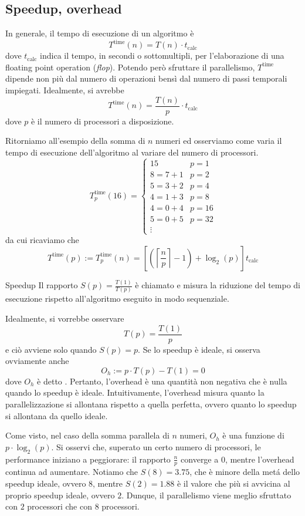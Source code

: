 \subsection{Speedup, overhead}
In generale, il tempo di esecuzione di un algoritmo è
$$T^{\text{time}}(n)=T(n)\cdot t_{\text{calc}}$$
dove $t_{\text{calc}}$ indica il tempo, in secondi o sottomultipli, per l'elaborazione di una floating point operation (\textit{flop}).
Potendo però sfruttare il parallelismo, $T^{\text{time}}$ dipende non più dal numero di operazioni bensì dal numero di passi temporali impiegati. 
Idealmente, si avrebbe
$$T^{\text{time}}(n)=\frac{T(n)}{p}\cdot t_{\text{calc}}$$
dove $p$ è il numero di processori a disposizione.

Ritorniamo all'esempio della somma di $n$ numeri ed osserviamo come varia il tempo di esecuzione dell'algoritmo al variare del numero di processori.
$$T^{\text{time}}_{p}(16)=\begin{cases}
15 &p=1 \\
8=7+1 &p=2 \\
5=3+2 &p=4 \\
4=1+3 &p=8 \\
4=0+4 &p=16 \\
5=0+5 &p=32 \\
\vdots
\end{cases}$$
da cui ricaviamo che
$$T^{\text{time}}(p):=T^{\text{time}}_{p}(n)=\left[\left(\left\lceil   \frac{n}{p}\right\rceil-1\right) + \log_2(p)\right]t_{\text{calc}} $$

\begin{definition}{Speedup}
Il rapporto $S(p) =\frac{T(1)}{T(p)}$ è chiamato  e misura la riduzione del tempo di esecuzione rispetto all'algoritmo eseguito in modo sequenziale.
\end{definition}

Idealmente, si vorrebbe osservare
$$T(p)=\frac{T(1)}{p}$$
e ciò avviene solo quando $S(p)=p$. Se lo speedup è ideale, si osserva ovviamente anche
$$O_{h}:=p\cdot T(p)-T(1)=0$$
dove $O_{h}$ è detto . Pertanto, l'overhead è una quantità non negativa che è nulla quando lo speedup è ideale. 
Intuitivamente, l'overhead misura quanto la parallelizzazione si allontana rispetto a quella perfetta, ovvero quanto lo speedup si allontana da quello ideale.

Come visto, nel caso della somma parallela di $n$ numeri, $O_h$ è una funzione di $p\cdot \log_2(p)$. Si osservi che, superato un certo numero di processori, le performance iniziano a peggiorare: il rapporto $\frac{n}{p}$ converge a $0$, mentre l'overhead continua ad aumentare.
Notiamo che $S(8) = 3.75$, che è minore della metá dello speedup ideale, ovvero $8$, mentre $S(2) = 1.88$ è il valore che più si avvicina al proprio speedup ideale, ovvero $2$. Dunque, il parallelismo viene meglio sfruttato con $2$ processori che con $8$ processori. 

